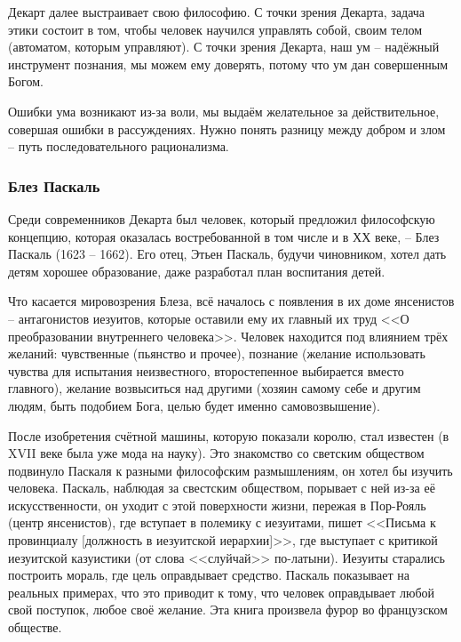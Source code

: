 \documentclass[a4paper, 12pt]{book} %
\begin{document}
Декарт далее выстраивает свою философию. С точки зрения Декарта, задача этики состоит в том, чтобы человек научился управлять собой, своим телом (автоматом, которым управляют). С точки зрения Декарта, наш ум -- надёжный инструмент познания, мы можем ему доверять, потому что ум дан совершенным Богом. 

Ошибки ума возникают из-за воли, мы выдаём желательное за действительное, совершая ошибки в рассуждениях. Нужно понять разницу между добром и злом -- путь последовательного рационализма.

\subsubsection{Блез Паскаль}

Среди современников Декарта был человек, который предложил философскую концепцию, которая оказалась востребованной в том числе и в ХХ веке, -- Блез Паскаль (1623 -- 1662). Его отец, Этьен Паскаль, будучи чиновником, хотел дать детям хорошее образование, даже разработал план воспитания детей. 

Что касается мировозрения Блеза, всё началось с появления в их доме янсенистов -- антагонистов иезуитов, которые оставили ему их главный их труд <<О преобразовании внутреннего человека>>. Человек находится под влиянием трёх желаний: чувственные (пьянство и прочее), познание (желание использовать чувства для испытания неизвестного, второстепенное выбирается вместо главного), желание возвыситься над другими (хозяин самому себе и другим людям, быть подобием Бога, целью будет именно самовозвышение).

После изобретения счётной машины, которую показали королю, стал известен (в XVII веке была уже мода на науку). Это знакомство со светским обществом подвинуло Паскаля к разными философским размышлениям, он хотел бы изучить человека. Паскаль, наблюдая за свестским обществом, порывает с ней из-за её искусственности, он уходит с этой поверхности жизни, пережая в Пор-Рояль (центр янсенистов), где вступает в полемику с иезуитами, пишет <<Письма к провинциалу [должность в иезуитской иерархии]>>, где выступает с критикой иезуитской казуистики (от слова <<слуйчай>> по-латыни). Иезуиты старались построить мораль, где цель оправдывает средство. Паскаль показывает на реальных примерах, что это приводит к тому, что человек оправдывает любой свой поступок, любое своё желание. Эта книга произвела фурор во французском обществе. 
\end{document}
